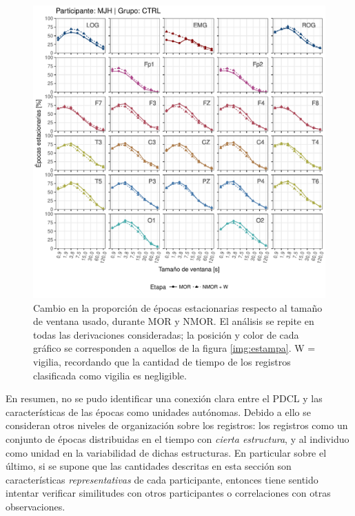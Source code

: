 \documentclass[12pt,letterpaper]{book}
\begin{document}
\begin{figure}
\centering
\includegraphics[width=\linewidth]{./scripts_graf_res/MJNNVIGILOS_cabeza_epocas_v2.pdf}
\caption{Cambio en la proporción de épocas estacionarias respecto al tamaño de ventana usado, durante MOR y NMOR. El análisis se repite en todas las derivaciones consideradas; la posición y color de cada gráfico se corresponden a aquellos de la figura \ref{img:estampa}. W = vigilia, recordando que la cantidad de tiempo de los registros clasificada como vigilia es negligible.}
\label{cabeza_repoio}
\end{figure}

En resumen, no se pudo identificar una conexión clara entre el PDCL y las características de las épocas como unidades autónomas.
%
Debido a ello se consideran otros niveles de organización sobre los registros: los registros como un conjunto de épocas distribuidas en el tiempo con \textit{cierta estructura}, y al individuo como unidad en la variabilidad de dichas estructuras.
%
En particular sobre el último, si se supone que las cantidades descritas en esta sección son características \textit{representativas} de cada participante, entonces tiene sentido intentar verificar similitudes con otros participantes o correlaciones con otras observaciones.

\end{document}

